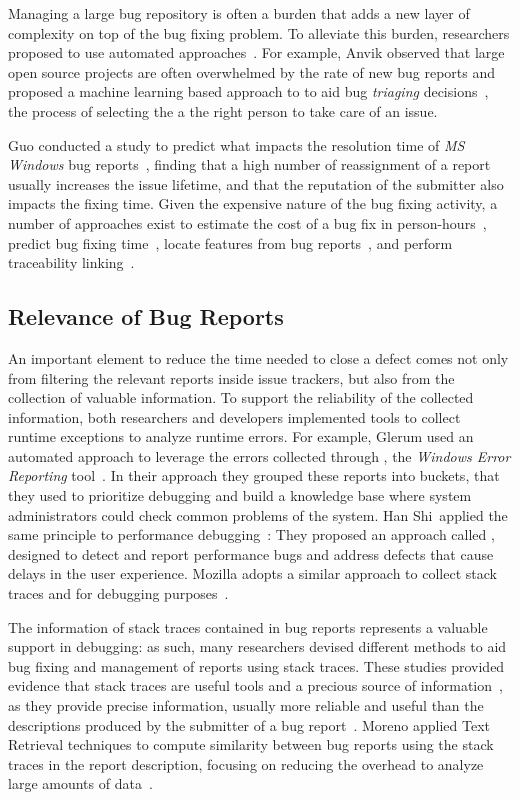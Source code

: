 Managing a large bug repository is often a burden that adds a new layer of complexity on top of the bug fixing problem.
To alleviate this burden, researchers proposed to use automated approaches~\cite{Weim2006}.
For example, Anvik \etal observed that large open source projects are often overwhelmed by the rate of new bug reports and proposed a machine learning based approach to to aid bug \emph{triaging} decisions~\cite{Anvi2006a}, the process of selecting the a the right person to take care of an issue.

Guo \etal conducted a study to predict what impacts the resolution time of \textit{MS Windows} bug reports~\cite{Guo2010}, finding that a high number of reassignment of a report usually increases the issue lifetime, and that the reputation of the submitter also impacts the fixing time.
Given the expensive nature of the bug fixing activity, a number of approaches exist to estimate the cost of a bug fix in person-hours~\cite{Weis2007a}, predict bug fixing time~\cite{Gige2010}, locate features from bug reports~\cite{Dit2013a}, and perform traceability linking~\cite{Biss2013a}.


\subsection{Relevance of Bug Reports}

An important element to reduce the time needed to close a defect comes not only from filtering the relevant reports inside issue trackers, but also from the collection of valuable information.
To support the reliability of the collected information, both researchers and developers implemented tools to collect runtime exceptions to analyze runtime errors.
For example, Glerum \etal used an automated approach to leverage the errors collected through , the \emph{Windows Error Reporting} tool~\cite{Glerum2009}.
In their approach they grouped these reports into buckets, that they used to prioritize debugging and build a knowledge base where system administrators could check common problems of the system.
Han Shi~\etal applied the same principle to performance debugging~\cite{Han2012}: They proposed an approach called , designed to detect and report performance bugs and address defects that cause delays in the user experience.
Mozilla adopts a similar approach to collect stack traces and for debugging purposes~\cite{McLa2004}.

The information of stack traces contained in bug reports represents a valuable support in debugging: as such, many researchers devised different methods to aid bug fixing and management of reports using stack traces.
These studies provided evidence that stack traces are useful tools and a precious source of information~\cite{Davie2013,Wang2013,Brod2005,Weis2007a}, as they provide precise information, usually more reliable and useful than the descriptions produced by the submitter of a bug report~\cite{Ko2006}.
Moreno \etal applied Text Retrieval techniques to compute similarity between bug reports using the stack traces in the report description, focusing on reducing the overhead to analyze large amounts of data~\cite{Moreno2014}.

